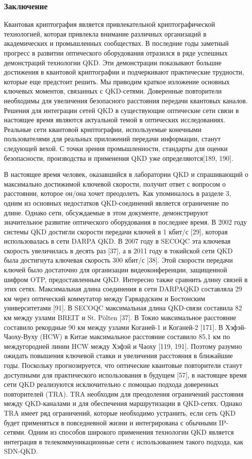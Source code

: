 \subsubsection{Заключение}
Квантовая криптография является привлекательной криптографической технологией, которая привлекла внимание различных организаций в академических и промышленных сообществах. В последние годы заметный прогресс в развитии оптического оборудования отразился в ряде успешных демонстраций технологии QKD. Эти демонстрации показывают большие достижения в квантовой криптографии и подчеркивают практические трудности, которые еще предстоит решить.
Мы приводим краткое изложение основных ключевых моментов, связанных с QKD-сетями. Доверенные повторители необходимы для увеличения безопасного расстояния передачи квантовых каналов. Решения для интеграции сетей QKD в существующие оптические сети связи в настоящее время являются актуальной темой в оптических исследованиях. Реальные сети квантовой криптографии, используемые конечными пользователями для реальных приложений передачи информации, станут следующей вехой. С точки зрения промышленности, стандарты для оценки безопасности, производства и применения QKD уже определяются[189, 190].

В настоящее время человек, оказавшийся в лаборатории QKD и спрашивающий о максимально достижимой ключевой скорости, получит ответ с вопросом о расстоянии, которое он/она хочет преодолеть.
Как упоминалось в разделе 3, одним из основных недостатков QKD-соединений является ограничение по длине. Однако сети, обсуждаемые в этом документе, демонстрируют значительное развитие оптического оборудования в последнее время. В 2002 году системы QKD достигли скорости передачи ключей в 1 кбит/с [29], которая использовалась в сети DARPA QKD. В 2007 году в SECOQC эта ключевая скорость увеличилась в десять раз [37], а в 2011 году в токийской сети QKD была достигнута ключевая скорость 300 кбит/с [38]. Этой скорости передачи ключей было достаточно для организации видеоконференции, защищенной шифром OTP, предоставленным QKD. Интересно также сравнить длину связей в этих сетях. Максимальная длина соединения в сети DARPAQKD составляла 29 км через оптический коммутатор между Гарвардским и Бостонским университетами [91]. В SECOQC максимальная длина QKD-связи составила 82 км между узлами BREIT и St. Pölten [37]. В Токио максимальное расстояние составило рекордные 90 км между узлами Коганей-1 и Коганей-2 [171]. В Хэфэй-Чаоху-Вуху (HCW) в Китае максимальное расстояние составило
85,1 км по междугородней линии HCW между Хэфэй и Чаоху [119, 191].
Поэтому разумно ожидать повышения ключевой ставки и увеличения расстояния в ближайшие годы.
Поскольку прогнозируется, что оптические квантовые повторители станут доступными для практического использования в будущем [57], в настоящее время сети QKD реализуются исключительно с помощью подхода доверенных повторителей (TRA). TRA необходим для преодоления ограничений расстояния между QKD-каналами и для обеспечения маршрутизации в QKD-сетях. Однако TRA имеет ряд ограничений, которые необходимо устранить, если сеть QKD будет применяться в повседневной жизни и интегрирована с обычными IP-сетями.
Одним из способов широкого применения технологии QKD является интеграция в телекоммуникационные сети с использованием такого подхода, как SDN-QKD.
